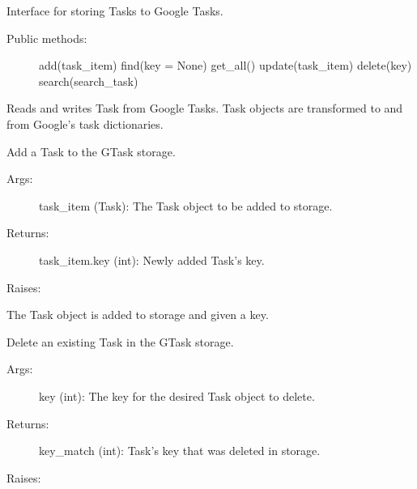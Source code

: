\documentclass[letterpaper,10pt,english]{sphinxmanual}
\begin{document}
\begin{fulllineitems}
\label{index:storage.GTaskStorage}
Interface for storing Tasks to Google Tasks.
\begin{description}
\item[{Public methods:}] \leavevmode
add(task\_item)
find(key = None)
get\_all()
update(task\_item)
delete(key)
search(search\_task)

\end{description}

Reads and writes Task from Google Tasks. Task objects are transformed
to and from Google's task dictionaries.


\begin{fulllineitems}
\label{index:storage.GTaskStorage.add}
Add a Task to the GTask storage.
\begin{description}
\item[{Args:}] \leavevmode
task\_item (Task): The Task object to be added to storage.

\item[{Returns:}] \leavevmode
task\_item.key (int): Newly added Task's key.

\end{description}

Raises:

The Task object is added to storage and given a key.

\end{fulllineitems}



\begin{fulllineitems}
\label{index:storage.GTaskStorage.delete}
Delete an existing Task in the GTask storage.
\begin{description}
\item[{Args:}] \leavevmode
key (int): The key for the desired Task object to delete.

\item[{Returns:}] \leavevmode
key\_match (int): Task's key that was deleted in storage.

\end{description}

Raises:


\end{fulllineitems}
\end{fulllineitems}
\end{document}
